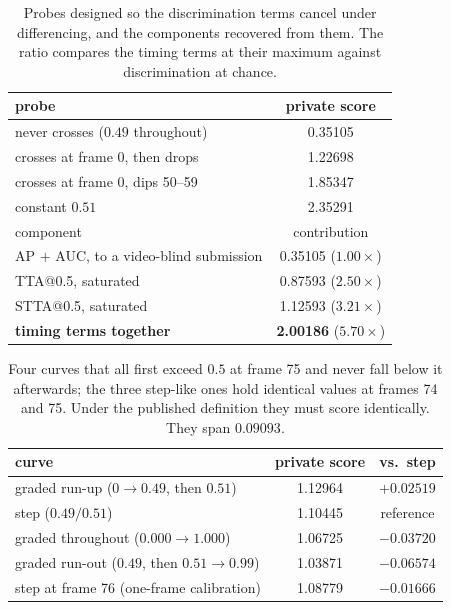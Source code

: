 \begin{table}[t]
\caption{Probes designed so the discrimination terms cancel under differencing,
and the components recovered from them. The ratio compares the timing terms at
their maximum against discrimination at chance.}
\label{tab:decomp}
\centering
\begin{tabular}{@{}lc@{}}
\toprule
probe & private score \\
\midrule
never crosses ($0.49$ throughout) & 0.35105 \\
crosses at frame 0, then drops & 1.22698 \\
crosses at frame 0, dips 50--59 & 1.85347 \\
constant $0.51$ & 2.35291 \\
\midrule
component & contribution \\
\midrule
AP $+$ AUC, to a video-blind submission & 0.35105 \quad ($1.00\times$) \\
TTA@0.5, saturated & 0.87593 \quad ($2.50\times$) \\
STTA@0.5, saturated & 1.12593 \quad ($3.21\times$) \\
\textbf{timing terms together} & \textbf{2.00186} \quad ($\mathbf{5.70\times}$) \\
\bottomrule
\end{tabular}
\end{table}

\begin{table}[t]
\caption{Four curves that all first exceed $0.5$ at frame 75 and never fall
below it afterwards; the three step-like ones hold identical values at frames
74 and 75. Under the published definition they must score identically. They
span $0.09093$.}
\label{tab:anomaly}
\centering
\begin{tabular}{@{}lcc@{}}
\toprule
curve & private score & vs.\ step \\
\midrule
graded run-up ($0 \to 0.49$, then $0.51$) & 1.12964 & $+0.02519$ \\
step ($0.49 / 0.51$) & 1.10445 & reference \\
graded throughout ($0.000 \to 1.000$) & 1.06725 & $-0.03720$ \\
graded run-out ($0.49$, then $0.51 \to 0.99$) & 1.03871 & $-0.06574$ \\
\midrule
step at frame 76 (one-frame calibration) & 1.08779 & $-0.01666$ \\
\bottomrule
\end{tabular}
\end{table}

